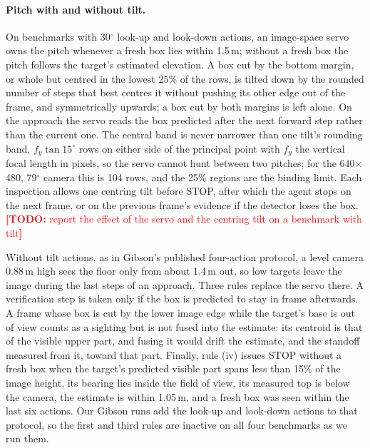 \documentclass[10pt]{article}
\newcommand{\TODO}[1]{\textcolor{red}{\textbf{[TODO:} #1\textbf{]}}}
\begin{document}
\paragraph{Pitch with and without tilt.}
On benchmarks with 30$^\circ$ look-up and look-down actions, an image-space servo owns the pitch whenever a fresh box
lies within 1.5\,m; without a fresh box the pitch follows the target's estimated elevation. A box cut by the bottom
margin, or whole but centred in the lowest 25\% of the rows, is tilted down by the rounded number of steps that best
centres it without pushing its other edge out of the frame, and symmetrically upwards; a box cut by both margins is
left alone. On the approach the servo reads the box predicted after the next forward step rather than the current one.
The central band is never narrower than one tilt's rounding band, $f_y\tan 15^\circ$ rows on either side of the
principal point with $f_y$ the vertical focal length in pixels, so the servo cannot hunt between two pitches; for the
640$\times$480, 79$^\circ$ camera this is 104 rows, and the 25\% regions are the binding limit. Each inspection allows
one centring tilt before STOP, after which the agent stops on the next frame, or on the previous frame's evidence if
the detector loses the box. \TODO{report the effect of the servo and the centring tilt on a benchmark with tilt}

Without tilt actions, as in Gibson's published four-action protocol, a level camera 0.88\,m high sees the floor only
from about 1.4\,m out, so low targets leave the image during the last steps of an approach. Three rules replace the
servo there. A verification
step is taken only if the box is predicted to stay in frame afterwards. A frame whose box is cut by the lower image
edge while the target's base is out of view counts as a sighting but is not fused into the estimate: its centroid is
that of the visible upper part, and fusing it would drift the estimate, and the standoff measured from it, toward that
part. Finally, rule (iv) issues STOP without a fresh box when the target's predicted visible part spans less than 15\% of the
image height, its bearing lies inside the field of view, its measured top is below the camera, the estimate is within
1.05\,m, and a fresh box was seen within the last six actions. Our Gibson runs add the look-up and look-down actions to
that protocol, so the first and third rules are inactive on all four benchmarks as we run them.

\end{document}
